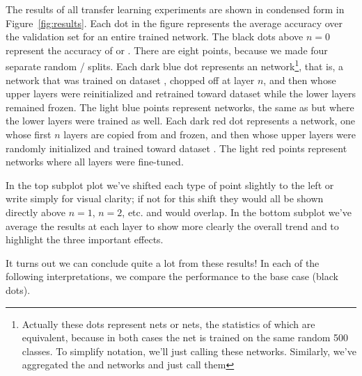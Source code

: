 The results of all transfer learning experiments are shown in condensed form in Figure~\ref{fig:results}. Each dot in the figure represents the average accuracy over the validation set for an entire trained network. The black dots above $n=0$ represent the accuracy of  or . There are eight points, because we made four separate random / splits. Each dark blue dot represents an  network\footnote{Actually these dots represent  nets or  nets, the statistics of which are equivalent, because in both cases the net is trained on the same random 500 classes. To simplify notation, we'll just calling these  networks. Similarly, we've aggregated the  and  networks and just call them }, that is, a network that was trained on dataset \dA, chopped off at layer $n$, and then whose upper layers were reinitialized and retrained toward dataset \dA while the lower layers remained frozen. The light blue points represent  networks, the same as  but where the lower layers were trained as well. Each dark red dot represents a  network, one whose first $n$ layers are copied from  and frozen, and then whose upper layers were randomly initialized and trained toward dataset \dA. The light red points represent  networks where all layers were fine-tuned.

In the top subplot plot we've shifted each type of point slightly to the left or write simply for visual clarity; if not for this shift they would all be shown directly above $n=1$, $n=2$, etc. and would overlap. In the bottom subplot we've average the results at each layer to show more clearly the overall trend and to highlight the three important effects.

It turns out we can conclude quite a lot from these results! In each of the following interpretations, we compare the performance to the base case (black dots).

